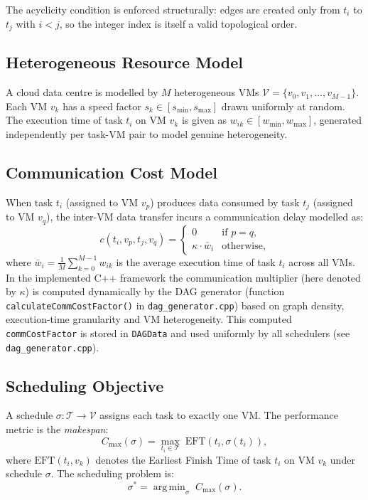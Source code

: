 \documentclass[conference]{IEEEtran}
\DeclareMathOperator*{\argmin}{arg\,min}
\newcommand{\EFT}{\mathrm{EFT}}
\begin{document}
The acyclicity condition is enforced structurally: edges are created
only from $t_i$ to $t_j$ with $i < j$, so the integer index is
itself a valid topological order.

\subsection{Heterogeneous Resource Model}

A cloud data centre is modelled by $M$ heterogeneous VMs
$\mathcal{V} = \{v_0, v_1, \ldots, v_{M-1}\}$. Each VM $v_k$ has a
speed factor $s_k \in [s_{\min}, s_{\max}]$ drawn uniformly at
random. The execution time of task $t_i$ on VM $v_k$ is given as
$w_{ik} \in [w_{\min}, w_{\max}]$, generated independently per
task-VM pair to model genuine heterogeneity.

\subsection{Communication Cost Model}

When task $t_i$ (assigned to VM $v_p$) produces data consumed by
task $t_j$ (assigned to VM $v_q$), the inter-VM data transfer incurs
a communication delay modelled as:
\begin{equation}
      c(t_i, v_p, t_j, v_q) =
      \begin{cases}
            0 & \text{if } p = q,\\
            \kappa \cdot \bar{w}_i & \text{otherwise,}
      \end{cases}
      \label{eq:comm}
\end{equation}
where $\bar{w}_i = \frac{1}{M}\sum_{k=0}^{M-1} w_{ik}$ is the
average execution time of task $t_i$ across all VMs. In the
implemented C++ framework the communication multiplier (here denoted
by $\kappa$) is computed dynamically by the DAG generator
(function \texttt{calculateCommCostFactor()} in \texttt{dag\_generator.cpp})
based on graph density, execution-time granularity and VM heterogeneity.
This computed \texttt{commCostFactor} is stored in \texttt{DAGData} and
used uniformly by all schedulers (see \texttt{dag\_generator.cpp}).

\subsection{Scheduling Objective}

A schedule $\sigma : \mathcal{T} \to \mathcal{V}$ assigns each task
to exactly one VM. The performance metric is the \emph{makespan}:
\begin{equation}
  C_{\max}(\sigma) = \max_{t_i \in \mathcal{T}}\; \EFT(t_i, \sigma(t_i)),
  \label{eq:makespan}
\end{equation}
where $\EFT(t_i, v_k)$ denotes the Earliest Finish Time of task
$t_i$ on VM $v_k$ under schedule $\sigma$. The scheduling problem
is:
\begin{equation}
  \sigma^* = \argmin_{\sigma}\; C_{\max}(\sigma).
  \label{eq:opt}
\end{equation}
\end{document}
